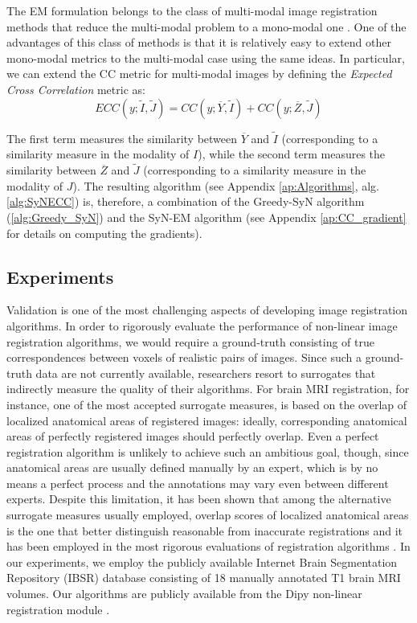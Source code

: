The EM formulation belongs to the class of multi-modal image registration methods that reduce the multi-modal problem to a mono-modal one \citep{Sotiras2013}. One of the advantages of this class of methods is that it is relatively easy to extend other mono-modal metrics to the multi-modal case using the same ideas. In particular, we can extend the CC metric for multi-modal images by defining the {\it Expected Cross Correlation} metric as:
\begin{equation}\label{eq:ecc_metric}
    ECC(y;\tilde{I}, \tilde{J}) = CC(y; \overline{Y}, \tilde{I}) + CC(y; \overline{Z}, \tilde{J})
\end{equation}

The first term measures the similarity between $\overline{Y}$ and $\tilde{I}$ (corresponding to a similarity measure in the modality of $I$), while the second term measures the
similarity between $\overline{Z}$ and $\tilde{J}$ (corresponding to a similarity measure in the modality of $J$). The resulting algorithm (see Appendix \ref{ap:Algorithms}, alg. \ref{alg:SyNECC}) is, therefore, a combination of the Greedy-SyN algorithm (\ref{alg:Greedy_SyN}) and the SyN-EM algorithm (see Appendix \ref{ap:CC_gradient} for details on
computing the gradients).


\subsection{Experiments}
Validation is one of the most challenging aspects of developing image registration algorithms. In order to rigorously evaluate the performance of non-linear
image registration algorithms, we would require a ground-truth consisting of true correspondences between voxels of realistic pairs of images. Since such a ground-truth data are not currently available, researchers resort to surrogates that indirectly measure the quality of their algorithms. For brain MRI registration, for instance, one of the most accepted surrogate measures, is based on the overlap of localized anatomical areas of registered images: ideally, corresponding anatomical areas of perfectly registered images should perfectly overlap. Even a perfect registration algorithm is unlikely to achieve such an ambitious goal, though, since anatomical areas are usually defined manually by an expert, which is by no means a perfect process and the annotations may vary even between different experts. Despite this limitation, it has been shown that among the alternative surrogate measures usually employed, overlap scores of localized anatomical areas is the one that better distinguish reasonable from inaccurate registrations \citep{Rohlfing2012} and it has been employed in the most rigorous evaluations of registration algorithms \citep{Klein2009, Klein2010, Rohlfing2012}. In our experiments, we employ the publicly available Internet Brain Segmentation Repository (IBSR) database consisting of 18 manually annotated T1 brain MRI volumes. Our algorithms are publicly available from the Dipy non-linear registration module \citep{Garyfallidis2014}.\\

